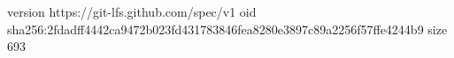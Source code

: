 version https://git-lfs.github.com/spec/v1
oid sha256:2fdadff4442ca9472b023fd431783846fea8280e3897c89a2256f57ffe4244b9
size 693
